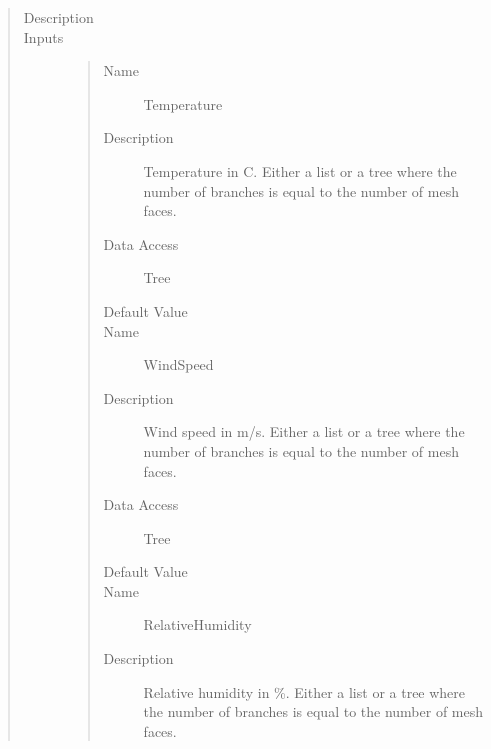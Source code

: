 \documentclass[letterpaper,10pt,english]{sphinxmanual}
\begin{document}
\begin{quote}\begin{description}
\item[{Description}] \leavevmode
{}

\item[{Inputs}] \leavevmode\begin{quote}\begin{description}
\item[{Name}] \leavevmode
Temperature

\item[{Description}] \leavevmode
Temperature in C. Either a list or a tree where the number of branches is equal to the number
of mesh faces.

\item[{Data Access}] \leavevmode
Tree

\item[{Default Value}] \leavevmode
{}

\item[{Name}] \leavevmode
WindSpeed

\item[{Description}] \leavevmode
Wind speed in m/s. Either a list or a tree where the number of branches is equal to the number
of mesh faces.

\item[{Data Access}] \leavevmode
Tree

\item[{Default Value}] \leavevmode
{}

\item[{Name}] \leavevmode
RelativeHumidity

\item[{Description}] \leavevmode
Relative humidity in \%. Either a list or a tree where the number of branches is equal to the number
of mesh faces.


\end{description}
\end{quote}
\end{description}
\end{quote}
\end{document}
